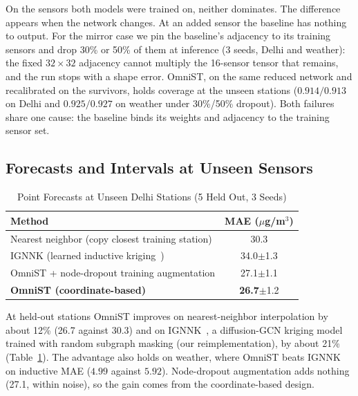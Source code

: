 \documentclass[journal]{IEEEtran}
\begin{document}
On the sensors both models were trained on, neither dominates. The difference appears when the
network changes. At an added sensor the baseline has nothing to output. For the mirror case we pin
the baseline's adjacency to its training sensors and drop 30\% or 50\% of them at inference (3 seeds,
Delhi and weather): the fixed $32{\times}32$ adjacency cannot multiply the 16-sensor tensor that
remains, and the run stops with a shape error. OmniST, on the same reduced network and recalibrated on
the survivors, holds coverage at the unseen stations ($0.914/0.913$ on Delhi and $0.925/0.927$ on
weather under 30\%/50\% dropout). Both failures share one cause: the baseline binds its weights and
adjacency to the training sensor set.

\subsection{Forecasts and Intervals at Unseen Sensors}
\label{sec:conformal-results}

\begin{table}[htbp]
\caption{Point Forecasts at Unseen Delhi Stations (5 Held Out, 3 Seeds)}
\centering
\begin{tabular}{lc}
\toprule
\textbf{Method} & \textbf{MAE ($\mu$g/m$^3$)} \\
\midrule
Nearest neighbor (copy closest training station) & 30.3 \\
IGNNK (learned inductive kriging~\cite{ignnk2020}) & 34.0$\pm$1.3 \\
OmniST + node-dropout training augmentation & 27.1$\pm$1.1 \\
\textbf{OmniST (coordinate-based)} & \textbf{26.7}$\pm$1.2 \\
\bottomrule
\end{tabular}
\label{tab:inductive}
\end{table}

At held-out stations OmniST improves on nearest-neighbor interpolation by about 12\% (26.7 against
30.3) and on IGNNK~\cite{ignnk2020}, a diffusion-GCN kriging model trained with random subgraph
masking (our reimplementation), by about 21\% (Table~\ref{tab:inductive}). The advantage also holds
on weather, where OmniST beats IGNNK on inductive MAE ($4.99$ against $5.92$). Node-dropout
augmentation adds nothing (27.1, within noise), so the gain comes from the coordinate-based design.
\end{document}
